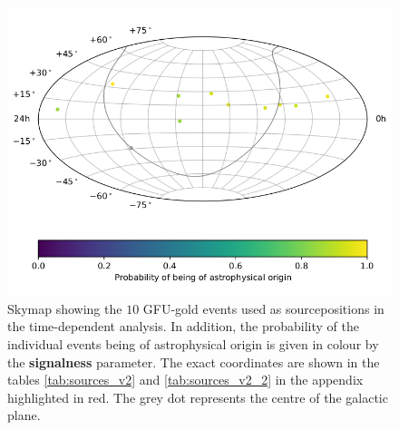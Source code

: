 \begin{figure}
    \centering
    \includegraphics[draft=false,width=\linewidth]{Plots/02_sources/gfu_gold_skymap_time_dep.png} %
    \caption{Skymap showing the $\num{10}$ GFU-gold events used as sourcepositions in the time-dependent analysis. In addition, the probability of the individual events being of astrophysical origin is given in colour by the \textbf{signalness} parameter. The exact coordinates are shown in the tables \ref{tab:sources_v2} and \ref{tab:sources_v2_2} in the appendix highlighted in red. The grey dot represents the centre of the galactic plane.}
    \label{fig:skymap_2}
\end{figure}

%    
%    
